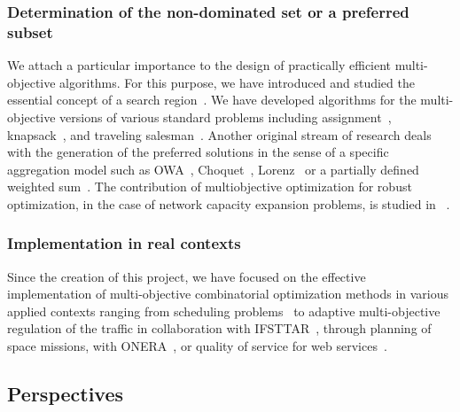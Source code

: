 \subsubsection{Determination of the non-dominated set or a preferred subset}

We attach a particular importance to the design of practically efficient multi-objective algorithms. For this purpose, we have introduced and studied the essential concept of a search region~\cite{Klamroth2015On-634730,Dachert2017Efficient-1250848}. We have developed algorithms for the multi-objective versions of various standard problems including assignment~\cite{Belhoul2014An-634706}, knapsack~\cite{Figueira2013Algorithmic-623559}, and traveling salesman~\cite{Cornu2017Perturbed-1168165}. Another original stream of research deals with the generation of the preferred solutions in the sense of a specific aggregation model such as OWA~\cite{Galand2012Exact-610325}, Choquet~\cite{DBLP:conf/ijcai/GalandLP13}, Lorenz~\cite{Galand2015Exact-1052488} or a partially defined weighted sum~\cite{Kaddani2017Weighted-1232001}. The contribution of multiobjective optimization for robust optimization, in the case of network capacity expansion problems, is studied in ~\cite{Aissi2016Robust-1096886}.




\subsubsection{Implementation in real contexts}


Since the creation of this project, we have focused on the effective implementation of multi-objective combinatorial optimization methods in various applied contexts ranging from scheduling problems~\cite{Aloulou2014A-624967} to adaptive multi-objective regulation of the traffic in collaboration with IFSTTAR~\cite{Dujardin2015A-634974}, through  planning of space missions, with ONERA~\cite{Madakat2013Biobjective-624327}, or quality of service for web services~\cite{Abu-Khzam2015On-1017005}.

\subsection{Perspectives}
